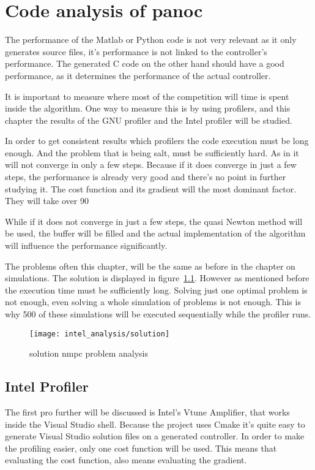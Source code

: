 \chapter{Code analysis of panoc}
The performance of the Matlab or Python code is not very relevant as it only generates source files, it's performance is not linked to the controller's performance. The generated C code on the other hand should have a good performance, as it determines the performance of the actual controller.

It is important to measure where most of the competition will time is spent inside the algorithm. One way to measure this is by using profilers, and this chapter the results of the GNU profiler and the Intel profiler will be studied.

In order to get consistent results which profilers the code execution must be long enough. And the problem that is being salt, must be sufficiently hard. As in it will not converge in only a few steps. Because if it does converge in just a few steps, the performance is already very good and there's no point in further studying it. The cost function and its gradient will the most dominant factor. They will take over 90%

While if it does not converge in just a few steps, the quasi Newton method will be used, the buffer will be filled and the actual implementation of the algorithm will influence the performance significantly.

The problems often this chapter, will be the same as before in the chapter on simulations. The solution is displayed in figure~\ref{fig:solution nmpc problem analysis}. However as mentioned before the execution time must be sufficiently long. Solving just one optimal problem is not enough, even solving a whole simulation of problems is not enough. This is why 500 of these simulations will be executed sequentially while the profiler runs.
\begin{figure}[H]
	\centering
	\texttt{[image: intel\_analysis/solution]}
	\caption{solution nmpc problem analysis}
	\label{fig:solution nmpc problem analysis}
\end{figure}

\section{Intel Profiler}
The first pro further will be discussed is Intel's Vtune Amplifier, that works inside the Visual Studio shell. Because the project uses Cmake it's quite easy to generate Visual Studio solution files on a generated controller. In order to make the profiling easier, only one cost function will be used. This means that evaluating the cost function, also means evaluating the gradient.

